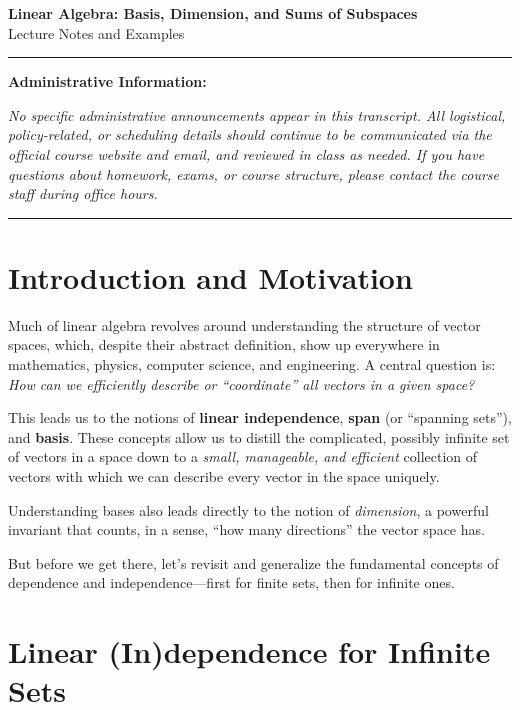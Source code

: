 \documentclass[11pt]{article}
\theoremstyle{definition}
\theoremstyle{plain}
\newenvironment{administrativeblock}
  {\begin{center}\begin{minipage}{0.95\linewidth}\color{blue}\hrule\vspace{2pt}\noindent\textbf{Administrative Information:}\par}
  {\vspace{2pt}\hrule\end{minipage}\end{center}}
\begin{document}
\begin{center}
    {\LARGE \textbf{Linear Algebra: Basis, Dimension, and Sums of Subspaces}}\\[0.5em]
    {\large Lecture Notes and Examples}\\[1em]
\end{center}

\begin{administrativeblock}
\vspace{0.5em}
\textit{No specific administrative announcements appear in this transcript. All logistical, policy-related, or scheduling details should continue to be communicated via the official course website and email, and reviewed in class as needed. If you have questions about homework, exams, or course structure, please contact the course staff during office hours.}
\vspace{0.5em}
\end{administrativeblock}

\tableofcontents
\newpage

\section{Introduction and Motivation}

Much of linear algebra revolves around understanding the structure of vector spaces, which, despite their abstract definition, show up everywhere in mathematics, physics, computer science, and engineering. A central question is: \emph{How can we efficiently describe or ``coordinate'' all vectors in a given space?}

This leads us to the notions of \textbf{linear independence}, \textbf{span} (or ``spanning sets''), and \textbf{basis}. These concepts allow us to distill the complicated, possibly infinite set of vectors in a space down to a \emph{small, manageable, and efficient} collection of vectors with which we can describe every vector in the space uniquely.

Understanding bases also leads directly to the notion of \emph{dimension}, a powerful invariant that counts, in a sense, ``how many directions'' the vector space has.

But before we get there, let's revisit and generalize the fundamental concepts of dependence and independence---first for finite sets, then for infinite ones.

\section{Linear (In)dependence for Infinite Sets}
\end{document}
